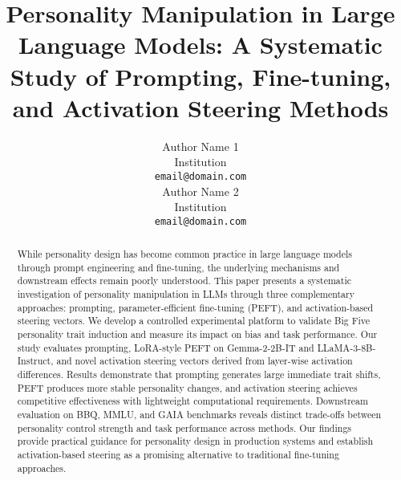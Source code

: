 \documentclass[11pt]{article}
\title{Personality Manipulation in Large Language Models: A Systematic Study of Prompting, Fine-tuning, and Activation Steering Methods}
\author{Author Name 1 \\
  Institution \\
  \texttt{email@domain.com} \\\And
  Author Name 2 \\
  Institution \\
  \texttt{email@domain.com} \\}
\begin{document}
\maketitle
\begin{abstract}
While personality design has become common practice in large language models through prompt engineering and fine-tuning, the underlying mechanisms and downstream effects remain poorly understood. This paper presents a systematic investigation of personality manipulation in LLMs through three complementary approaches: prompting, parameter-efficient fine-tuning (PEFT), and activation-based steering vectors. We develop a controlled experimental platform to validate Big Five personality trait induction and measure its impact on bias and task performance. Our study evaluates prompting, LoRA-style PEFT on Gemma-2-2B-IT and LLaMA-3-8B-Instruct, and novel activation steering vectors derived from layer-wise activation differences. Results demonstrate that prompting generates large immediate trait shifts, PEFT produces more stable personality changes, and activation steering achieves competitive effectiveness with lightweight computational requirements. Downstream evaluation on BBQ, MMLU, and GAIA benchmarks reveals distinct trade-offs between personality control strength and task performance across methods. Our findings provide practical guidance for personality design in production systems and establish activation-based steering as a promising alternative to traditional fine-tuning approaches.
\end{abstract}






\appendix













\end{document}

